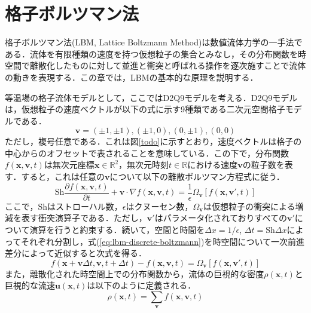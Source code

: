 \section{格子ボルツマン法 \label{section:lbm}}

格子ボルツマン法(LBM, Lattice Boltzmann Method)は数値流体力学の一手法である．流体を有限種類の速度を持つ仮想粒子の集合とみなし，その分布関数を時空間で離散化したものに対して並進と衝突と呼ばれる操作を逐次施すことで流体の動きを表現する．この章では，LBMの基本的な原理を説明する．

等温場の格子流体モデルとして，ここではD2Q9モデルを考える．D2Q9モデルは，仮想粒子の速度ベクトルが以下の式に示す9種類である二次元空間格子モデルである．
\begin{equation}
  \bm{v} = \left( \pm 1, \pm 1 \right), \left( \pm 1, 0 \right), \left( 0, \pm 1 \right), \left( 0, 0 \right)
  \label{eq:lbm-velocity}
\end{equation}
ただし，複号任意である．これは図\ref{todo}に示すとおり，速度ベクトルは格子の中心からのオフセットで表されることを意味している．この下で，分布関数$f(\bm{x}, \bm{v}, t)$は無次元座標$\bm{x} \in \mathbb{R}^2$，無次元時刻$t \in \mathbb{R}$における速度$\bm{v}$の粒子数を表す．すると，これは任意の$\bm{v}$について以下の離散ボルツマン方程式に従う\cite{todo}．
\begin{equation}
  \mathrm{Sh} \frac{\partial f(\bm{x}, \bm{v}, t)}{\partial t} + \bm{v} \cdot \nabla f(\bm{x}, \bm{v}, t) = \frac{1}{\epsilon} \Omega_{\bm{v}}\left[ f(\bm{x}, \bm{v}', t) \right]
  \label{eq:lbm-discrete-boltzmann}
\end{equation}
ここで，$\mathrm{Sh}$はストローハル数，$\epsilon$はクヌーセン数，$\Omega_{\bm{v}}$は仮想粒子の衝突による増減を表す衝突演算子である．ただし，$\bm{v}'$はパラメータ化されておりすべての$\bm{v}'$について演算を行うと約束する．続いて，空間と時間を$\Delta x = 1/\epsilon$, $\Delta t = \mathrm{Sh} \Delta x$によってそれぞれ分割し，式(\ref{eq:lbm-discrete-boltzmann})を時空間について一次前進差分によって近似すると次式を得る．
\begin{equation}
  f(\bm{x}+\bm{v}\Delta t, \bm{v}, t+\Delta t) - f(\bm{x}, \bm{v}, t) = \Omega_{\bm{v}}\left[ f(\bm{x}, \bm{v}', t) \right]
  \label{eq:lbm-lattice-boltzmann}
\end{equation}
また，離散化された時空間上での分布関数から，流体の巨視的な密度$\rho(\bm{x}, t)$と巨視的な流速$\bm{u}(\bm{x}, t)$は以下のように定義される．
\begin{equation}
  \rho(\bm{x}, t) = \sum_{\bm{v}} f(\bm{x}, \bm{v}, t)
  \label{eq:lbm-macro-density}
\end{equation}

